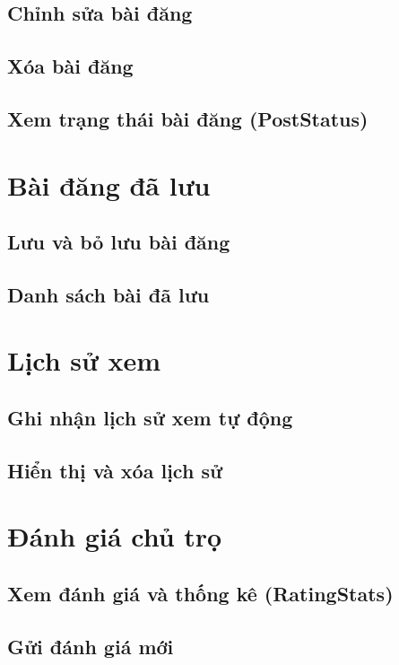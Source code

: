 \subsection{Chỉnh sửa bài đăng}


\subsection{Xóa bài đăng}


\subsection{Xem trạng thái bài đăng (PostStatus)}


\section{Bài đăng đã lưu}

\subsection{Lưu và bỏ lưu bài đăng}


\subsection{Danh sách bài đã lưu}


\section{Lịch sử xem}

\subsection{Ghi nhận lịch sử xem tự động}


\subsection{Hiển thị và xóa lịch sử}


\section{Đánh giá chủ trọ}

\subsection{Xem đánh giá và thống kê (RatingStats)}


\subsection{Gửi đánh giá mới}


